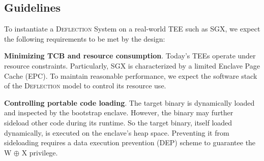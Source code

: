 



\subsection{Guidelines}
\label{subsec-challenges} 

To instantiate a \textsc{Deflection} System on a real-world TEE such as SGX, we expect the following requirements to be met by the design: 


\vspace{3pt}\noindent\textbf{Minimizing TCB and resource consumption}.\label{challenge-tcb}\label{challenge-size} 
Today's TEEs operate under resource constraints.  Particularly, SGX is characterized by a limited Enclave Page Cache (EPC). To maintain reasonable performance, we expect the software stack of the \textsc{Deflection} model to control its resource use. 

\vspace{3pt}\noindent\textbf{Controlling portable code loading}.\label{challenge-dep} The target binary is dynamically loaded and inspected by the bootstrap enclave. However, the binary may further sideload other code during its runtime. 
So the target binary, itself loaded dynamically, is executed on the enclave's heap space. Preventing it from sideloading requires a data execution prevention (DEP) scheme to guarantee the W $\oplus$ X privilege.

